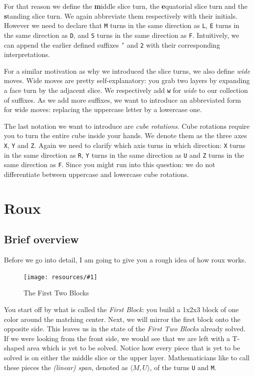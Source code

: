 \documentclass[a4paper]{scrreprt}
\newcommand{\img}[3]{
	\begin{figure}[ht]
	\centering
  \texttt{[image: resources/\#1]}
	\caption{#3}
	\end{figure}
}
\begin{document}
For that reason we define the \textbf{m}iddle slice turn, the \textbf{e}quatorial slice turn and the \textbf{s}tanding slice turn. We again abbreviate them respectively with their initials. However we need to declare that \texttt{M} turns in the same direction as \texttt{L}, \texttt{E} turns in the same direction as \texttt{D}, and \texttt{S} turns in the same direction as \texttt{F}. Intuitively, we can append the earlier defined suffixes \texttt{'} and \texttt{2} with their corresponding interpretations.\par

For a similar motivation as why we introduced the slice turns, we also define \emph{wide} moves. Wide moves are pretty self-explanatory: you grab two layers by expanding a face turn by the adjacent slice. We respectively add \texttt{w} for \emph{wide} to our collection of suffixes. As we add more suffixes, we want to introduce an abbreviated form for wide moves: replacing the uppercase letter by a lowercase one.\par

The last notation we want to introduce are \emph{cube rotations}. Cube rotations require you to turn the entire cube inside your hands. We denote them as the three axes \texttt{X}, \texttt{Y} and \texttt{Z}. Again we need to clarify which axis turns in which direction: \texttt{X} turns in the same direction as \texttt{R}, \texttt{Y} turns in the same direction as \texttt{U} and \texttt{Z} turns in the same direction as \texttt{F}. Since you might run into this question: we do not differentiate between uppercase and lowercase cube rotations.


\chapter{Roux}

\section{Brief overview}

Before we go into detail, I am going to give you a rough idea of how roux works.\par

\img{f2b_transparent.png}{0.3}{The First Two Blocks}

You start off by what is called the \emph{First Block}: you build a 1x2x3 block of one color around the matching center. Next, we will mirror the first block onto the opposite side. This leaves us in the state of the \emph{First Two Blocks} already solved. If we were looking from the front side, we would see that we are left with a T-shaped area which is yet to be solved. Notice how every piece that is yet to be solved is on either the middle slice or the upper layer. Mathematicians like to call these pieces the \emph{(linear) span}, denoted as $\langle M, U \rangle$, of the turns \texttt{U} and \texttt{M}.\par
\end{document}
